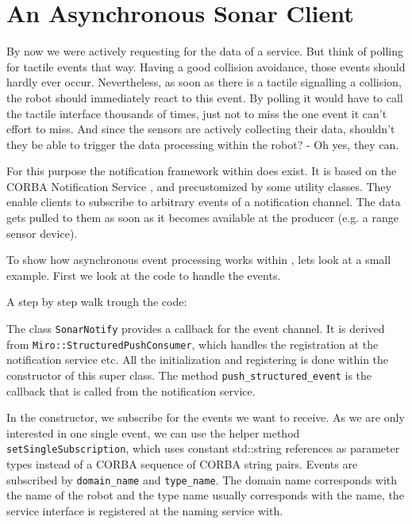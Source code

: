 
\label{lst:SonarPoll3}

\section{An Asynchronous Sonar Client}
\label{sec:notify}

By now we were actively requesting for the data of a service. But
think of polling for tactile events that way. Having a good
collision avoidance, those events should hardly ever occur.
Nevertheless, as soon as there is a tactile signalling a
collision, the robot should immediately react to this event. By
polling it would have to call the tactile interface thousands of
times, just not to miss the one event it can't effort to miss. And
since the sensors are actively collecting their data, shouldn't
they be able to trigger the data processing within the robot? - Oh
yes, they can.

For this purpose the notification framework within \miro does
exist. It is based on the CORBA Notification Service
\cite{OMG:00-5}, and precustomized by some utility classes. They
enable clients to subscribe to arbitrary events of a notification
channel. The data gets pulled to them as soon as it becomes
available at the producer (e.g. a range sensor device).

To show how asynchronous event processing works within \miro, lets
look at a small example. First we look at the code to handle the
events.


\label{lst:SonarNotify}

A step by step walk trough the code:



The class \lstinline!SonarNotify! provides a callback for the event
channel. It is derived from \lstinline!Miro::StructuredPushConsumer!,
which handles the registration at the notification service etc. All
the initialization and registering is done within the constructor of
this super class. The method \lstinline!push_structured_event! is the
callback that is called from the notification service.



In the constructor, we subscribe for the events we want to receive. As
we are only interested in one single event, we can use the helper
method \lstinline!setSingleSubscription!, which uses constant
std::string references as parameter types instead of a CORBA sequence
of CORBA string pairs. Events are subscribed by
\lstinline!domain_name! and \lstinline!type_name!.  The domain name
corresponds with the name of the robot and the type name usually
corresponds with the name, the service interface is registered at the
naming service with.

